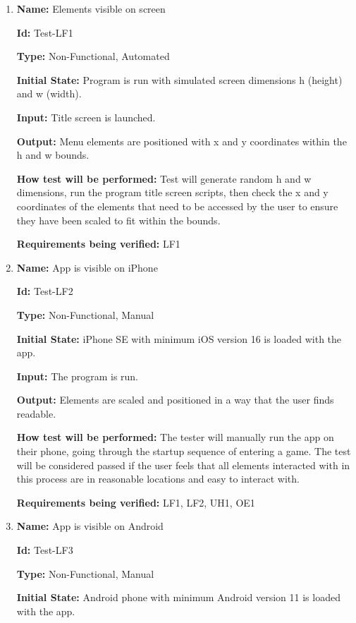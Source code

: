 \documentclass[12pt, titlepage]{article}
\begin{document}
\begin{enumerate}

\item{\textbf{Name:} Elements visible on screen}

\textbf{Id:} Test-LF1

\textbf{Type:} Non-Functional, Automated
					
\textbf{Initial State:} Program is run with simulated screen dimensions h (height) and w (width).
					
\textbf{Input:} Title screen is launched.
					
\textbf{Output:} Menu elements are positioned with x and y coordinates within the h and w bounds. 
					
\textbf{How test will be performed:} Test will generate random h and w dimensions, run the program title screen scripts, then check the x and y coordinates of the elements that need to be accessed by the user to ensure they have been scaled to fit within the bounds. 

\textbf{Requirements being verified:} LF1

\item{\textbf{Name:} App is visible on iPhone}

\textbf{Id:} Test-LF2

\textbf{Type:} Non-Functional, Manual
					
\textbf{Initial State:} iPhone SE with minimum iOS version 16 is loaded with the app.
					
\textbf{Input:} The program is run. 
					
\textbf{Output:} Elements are scaled and positioned in a way that the user finds readable. 
					
\textbf{How test will be performed:} The tester will manually run the app on their phone, going through the startup sequence of entering a game. The test will be considered passed if the user feels that all elements interacted with in this process are in reasonable locations and easy to interact with.

\textbf{Requirements being verified:} LF1, LF2, UH1, OE1

\item{\textbf{Name:} App is visible on Android}

\textbf{Id:} Test-LF3

\textbf{Type:} Non-Functional, Manual
					
\textbf{Initial State:} Android phone with minimum Android version 11 is loaded with the app.
					

\end{enumerate}
\end{document}
